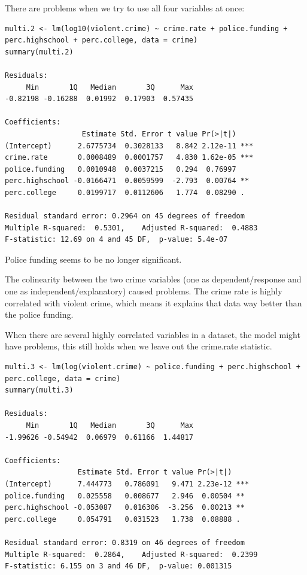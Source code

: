 \documentclass{article}
\begin{document}
There are problems when we try to use all four variables at once: 
\begin{lstlisting}
multi.2 <- lm(log10(violent.crime) ~ crime.rate + police.funding + perc.highschool + perc.college, data = crime)
summary(multi.2)

Residuals:
     Min       1Q   Median       3Q      Max 
-0.82198 -0.16288  0.01992  0.17903  0.57435 

Coefficients:
                  Estimate Std. Error t value Pr(>|t|)    
(Intercept)      2.6775734  0.3028133   8.842 2.12e-11 ***
crime.rate       0.0008489  0.0001757   4.830 1.62e-05 ***
police.funding   0.0010948  0.0037215   0.294  0.76997    
perc.highschool -0.0166471  0.0059599  -2.793  0.00764 ** 
perc.college     0.0199717  0.0112606   1.774  0.08290 .  

Residual standard error: 0.2964 on 45 degrees of freedom
Multiple R-squared:  0.5301,	Adjusted R-squared:  0.4883 
F-statistic: 12.69 on 4 and 45 DF,  p-value: 5.4e-07
\end{lstlisting}

Police funding seems to be no longer significant.\par 
The colinearity between the two crime variables (one as dependent/response and one as independent/explanatory) caused problems. The crime rate is highly correlated with violent crime, which means it explains that data way better than the police funding. \par
When there are several highly correlated variables in a dataset, the model might have problems, this still holds when we leave out the crime.rate statistic.

\begin{lstlisting}
multi.3 <- lm(log(violent.crime) ~ police.funding + perc.highschool + perc.college, data = crime)
summary(multi.3)

Residuals:
     Min       1Q   Median       3Q      Max 
-1.99626 -0.54942  0.06979  0.61166  1.44817 

Coefficients:
                 Estimate Std. Error t value Pr(>|t|)    
(Intercept)      7.444773   0.786091   9.471 2.23e-12 ***
police.funding   0.025558   0.008677   2.946  0.00504 ** 
perc.highschool -0.053087   0.016306  -3.256  0.00213 ** 
perc.college     0.054791   0.031523   1.738  0.08888 .  

Residual standard error: 0.8319 on 46 degrees of freedom
Multiple R-squared:  0.2864,	Adjusted R-squared:  0.2399 
F-statistic: 6.155 on 3 and 46 DF,  p-value: 0.001315
\end{lstlisting}
\end{document}
